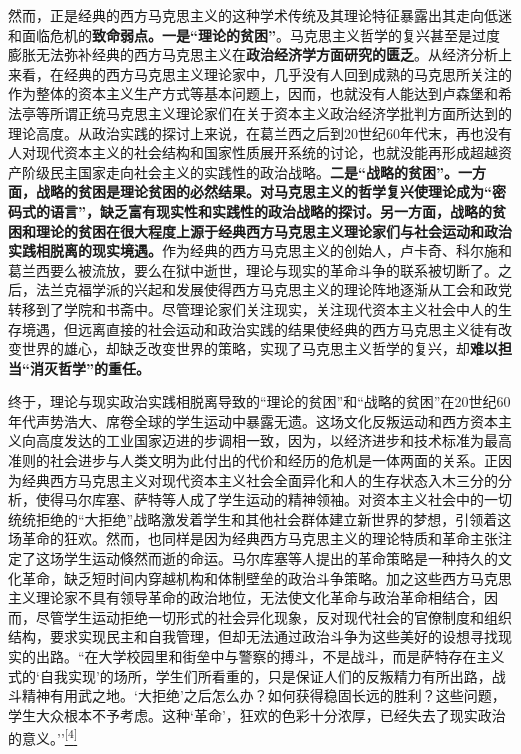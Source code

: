 \documentclass[UTF8, fontset = sourcesans, a4paper, oneside, zihao =
-4, scheme=chinese, no-math, space=true]{ctexbook}
\begin{document}
然而，正是经典的西方马克思主义的这种学术传统及其理论特征暴露出其走向低迷和面临危机的\textbf{致命弱点。一是``理论的贫困''}。马克思主义哲学的复兴甚至是过度膨胀无法弥补经典的西方马克思主义在\textbf{政治经济学方面研究的匮乏}。从经济分析上来看，在经典的西方马克思主义理论家中，几乎没有人回到成熟的马克思所关注的作为整体的资本主义生产方式等基本问题上，因而，也就没有人能达到卢森堡和希法亭等所谓正统马克思主义理论家们在关于资本主义政治经济学批判方面所达到的理论高度。从政治实践的探讨上来说，在葛兰西之后到20世纪60年代末，再也没有人对现代资本主义的社会结构和国家性质展开系统的讨论，也就没能再形成超越资产阶级民主国家走向社会主义的实践性的政治战略。\textbf{二是``战略的贫困''。一方面，战略的贫困是理论贫困的必然结果。对马克思主义的哲学复兴使理论成为``密码式的语言''，缺乏富有现实性和实践性的政治战略的探讨。另一方面，战略的贫困和理论的贫困在很大程度上源于经典西方马克思主义理论家们与社会运动和政治实践相脱离的现实境遇。}作为经典的西方马克思主义的创始人，卢卡奇、科尔施和葛兰西要么被流放，要么在狱中逝世，理论与现实的革命斗争的联系被切断了。之后，法兰克福学派的兴起和发展使得西方马克思主义的理论阵地逐渐从工会和政党转移到了学院和书斋中。尽管理论家们关注现实，关注现代资本主义社会中人的生存境遇，但远离直接的社会运动和政治实践的结果使经典的西方马克思主义徒有改变世界的雄心，却缺乏改变世界的策略，实现了马克思主义哲学的复兴，却\textbf{难以担当``消灭哲学''的重任。}

终于，理论与现实政治实践相脱离导致的``理论的贫困''和``战略的贫困''在20世纪60年代声势浩大、席卷全球的学生运动中暴露无遗。这场文化反叛运动和西方资本主义向高度发达的工业国家迈进的步调相一致，因为，以经济进步和技术标准为最高准则的社会进步与人类文明为此付出的代价和经历的危机是一体两面的关系。正因为经典西方马克思主义对现代资本主义社会全面异化和人的生存状态入木三分的分析，使得马尔库塞、萨特等人成了学生运动的精神领袖。对资本主义社会中的一切统统拒绝的``大拒绝''战略激发着学生和其他社会群体建立新世界的梦想，引领着这场革命的狂欢。然而，也同样是因为经典西方马克思主义的理论特质和革命主张注定了这场学生运动倏然而逝的命运。马尔库塞等人提出的革命策略是一种持久的文化革命，缺乏短时间内穿越机构和体制壁垒的政治斗争策略。加之这些西方马克思主义理论家不具有领导革命的政治地位，无法使文化革命与政治革命相结合，因而，尽管学生运动拒绝一切形式的社会异化现象，反对现代社会的官僚制度和组织结构，要求实现民主和自我管理，但却无法通过政治斗争为这些美好的设想寻找现实的出路。``在大学校园里和街垒中与警察的搏斗，不是战斗，而是萨特存在主义式的`自我实现'的场所，学生们所看重的，只是保证人们的反叛精力有所出路，战斗精神有用武之地。`大拒绝'之后怎么办？如何获得稳固长远的胜利？这些问题，学生大众根本不予考虑。这种`革命'，狂欢的色彩十分浓厚，已经失去了现实政治的意义。''\protect\hypertarget{part0005_split_001.htmlux5cux23w4}{}{}\protect\hyperlink{part0005_split_003.htmlux5cux23m4}{\textsuperscript{{[}4{]}}}
\end{document}
